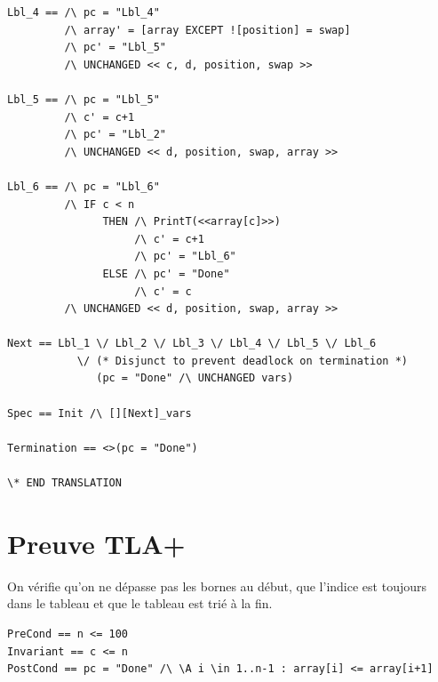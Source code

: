 \documentclass{scrreprt}
\begin{document}
\begin{lstlisting}
Lbl_4 == /\ pc = "Lbl_4"
         /\ array' = [array EXCEPT ![position] = swap]
         /\ pc' = "Lbl_5"
         /\ UNCHANGED << c, d, position, swap >>

Lbl_5 == /\ pc = "Lbl_5"
         /\ c' = c+1
         /\ pc' = "Lbl_2"
         /\ UNCHANGED << d, position, swap, array >>

Lbl_6 == /\ pc = "Lbl_6"
         /\ IF c < n
               THEN /\ PrintT(<<array[c]>>)
                    /\ c' = c+1
                    /\ pc' = "Lbl_6"
               ELSE /\ pc' = "Done"
                    /\ c' = c
         /\ UNCHANGED << d, position, swap, array >>

Next == Lbl_1 \/ Lbl_2 \/ Lbl_3 \/ Lbl_4 \/ Lbl_5 \/ Lbl_6
           \/ (* Disjunct to prevent deadlock on termination *)
              (pc = "Done" /\ UNCHANGED vars)

Spec == Init /\ [][Next]_vars

Termination == <>(pc = "Done")

\* END TRANSLATION

\end{lstlisting}

\section{Preuve TLA+}
On vérifie qu'on ne dépasse pas les bornes au début, que l'indice est toujours dans le tableau et que le tableau est trié à la fin.
\begin{lstlisting}
PreCond == n <= 100
Invariant == c <= n 
PostCond == pc = "Done" /\ \A i \in 1..n-1 : array[i] <= array[i+1]
\end{lstlisting}
\end{document}

